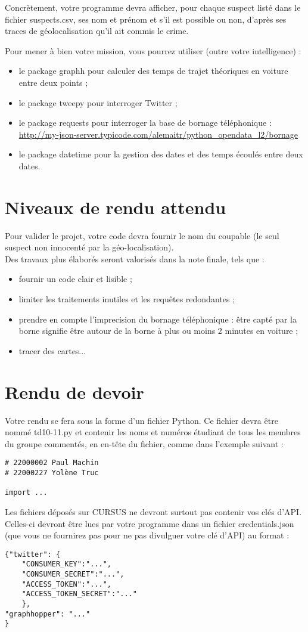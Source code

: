 \documentclass[11pt,a4paper]{article}
\begin{document}
Concrètement, votre programme devra afficher, pour chaque suspect listé dans le fichier suspects.csv, ses nom et prénom et s’il est possible ou non, d’après ses traces de géolocalisation qu’il ait commis le crime.


Pour mener à bien votre mission, vous pourrez utiliser (outre votre intelligence) :
\begin{itemize}
\item le package graphh pour calculer des temps de trajet théoriques en voiture entre deux points ;
\item le package tweepy pour interroger Twitter ;
\item le package requests pour interroger la base de bornage téléphonique : \url{http://my-json-server.typicode.com/alemaitr/python_opendata_l2/bornage}
\item le package datetime pour la gestion des dates et des temps écoulés entre deux dates.
\end{itemize}


\section{Niveaux de rendu attendu}

Pour valider le projet, votre code devra fournir le nom du coupable (le seul suspect non innocenté par la géo-localisation).
\\

Des travaux plus élaborés seront valorisés dans la note finale, tels que : 
\begin{itemize}
    \item fournir un code clair et lisible ;
    \item limiter les traitements inutiles et les requêtes redondantes ;
    \item prendre en compte l'imprecision du bornage téléphonique : être capté par la borne signifie être autour de la borne à plus ou moins 2 minutes en voiture ;
    \item tracer des cartes...
\end{itemize}


\section{Rendu de devoir}
Votre rendu se fera sous la forme d’un
fichier Python. Ce fichier devra être nommé td10-11.py et contenir les noms et numéros étudiant de tous
les membres du groupe commentés, en en-tête du fichier, comme dans l’exemple suivant :
\begin{verbatim}
# 22000002 Paul Machin
# 22000227 Yolène Truc

import ...
\end{verbatim}
Les fichiers déposés sur CURSUS ne devront surtout pas contenir vos clés d’API. Celles-ci devront être lues par votre programme dans un fichier credentials.json (que vous ne fournirez pas pour ne pas divulguer votre clé d’API) au format :
\begin{verbatim}
{"twitter": {
    "CONSUMER_KEY":"...",
    "CONSUMER_SECRET":"...",
    "ACCESS_TOKEN":"...",
    "ACCESS_TOKEN_SECRET":"..."
    },
"graphhopper": "..."
}
\end{verbatim}
\end{document}

